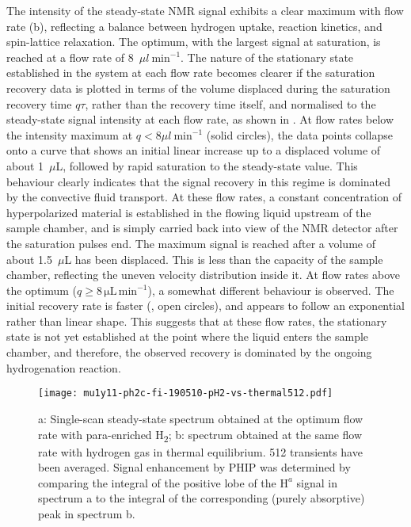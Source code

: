 The intensity of the steady-state NMR signal exhibits a clear maximum with flow
rate (b), reflecting a balance between hydrogen uptake,
reaction kinetics, and spin-lattice relaxation. The optimum, with the largest signal at
saturation, is reached at a flow rate of 8~$\mu{l}~\text{min}^{-1}$.
The nature of the stationary state established in the system at each
flow rate becomes clearer if the saturation recovery data is plotted in terms
of the volume displaced during the saturation recovery time $q\tau$, rather
than the recovery time itself, and normalised to the steady-state signal intensity
at each flow rate, as shown in . At flow rates below
the intensity maximum at $q<8\mu{l}~\text{min}^{-1}$ (solid
circles),
the data points collapse onto a curve that shows an initial linear increase
up to a displaced volume of about 1~$\mu$L, followed by rapid saturation to the
steady-state value. This behaviour clearly indicates that the
signal recovery in this regime is dominated by the convective fluid transport.
At these flow rates, a constant concentration of
hyperpolarized material is established in the flowing liquid upstream of the
sample chamber, and is simply carried back into view of the NMR detector
after the saturation pulses end.
The maximum signal is reached after a volume
of about 1.5~$\mu$L has been displaced. This is less than the capacity
of the sample chamber, reflecting the uneven velocity distribution inside it.
At flow rates above the optimum ($q\ge 8\,\mathrm{\mu L\,\text{min}^{-1}}$),
a somewhat different behaviour is observed. The initial recovery rate is
faster (, open circles), and appears to follow
an exponential rather than linear shape. This suggests that at these flow
rates, the stationary state is not yet established at the point where the
liquid enters the sample chamber, and therefore, the observed recovery
is dominated by the ongoing hydrogenation reaction.

\begin{figure}
  \begin{center}
    \texttt{[image: mu1y11-ph2c-fi-190510-pH2-vs-thermal512.pdf]}
  \end{center}
  \caption{	a: Single-scan steady-state spectrum obtained at the optimum flow rate
  	with para-enriched H\textsubscript{2}; b: spectrum obtained at the same flow
    rate with hydrogen gas
  	in thermal equilibrium. 512 transients have been averaged. Signal enhancement by
  	PHIP was determined by comparing the integral of the positive lobe of
    the $\mathrm{H}^a$ signal in spectrum a to the
  	integral of the corresponding (purely absorptive) peak in spectrum b.}
  \label{fig:pH2-vs-thermal512}
\end{figure}

